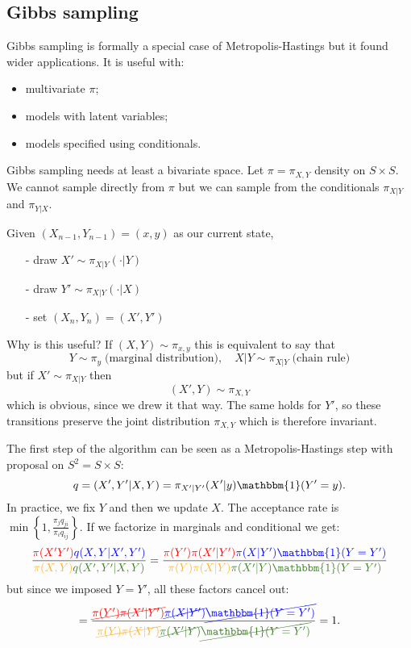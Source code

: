 \documentclass{article}
\begin{document}
	\subsection{Gibbs sampling}
	Gibbs sampling is formally a special case of Metropolis-Hastings but it found wider applications. It is useful with:
	\begin{itemize}
		\item multivariate $\pi$;
		\item models with latent variables;
		\item models specified using conditionals.
	\end{itemize}
	Gibbs sampling needs at least a bivariate space. Let $\pi=\pi_{X,Y}$ density on $S\times S$. We cannot sample directly from $\pi$ but we can sample from the conditionals $\pi_{X|Y}$ and $\pi_{Y|X}$.
	\begin{algorithm}
		Given $(X_{n-1},Y_{n-1})=(x,y)$ as our current state,
		\begin{itemize}
			\item [-] draw $X'\sim\pi_{X|Y}(\cdot|Y)$ 
			\item [-] draw $Y'\sim\pi_{X|Y}(\cdot|X)$
			\item [-] set $(X_n,Y_n)=(X',Y')$
		\end{itemize}
	\end{algorithm}
	Why is this useful? If $(X,Y)\sim\pi_{x,y}$ this is equivalent to say that
	\[
	Y\sim \pi_y \;\text{(marginal distribution)},\quad X|Y\sim\pi_{X|Y}\;\text{(chain rule)}
	\]
	but if $X'\sim \pi_{X|Y}$ then 
	\[
	(X',Y)\sim\pi_{X,Y}
	\]
	which is obvious, since we drew it that way. The same holds for $Y'$, so these transitions preserve the joint distribution $\pi_{X,Y}$ which is therefore invariant.
	\begin{proof2}
		The first step of the algorithm can be seen as a Metropolis-Hastings step with proposal on $S^2=S\times S$:
		\[
		q=(X',Y'|X,Y)=\pi_{X'|Y'}(X'|y)\mathbbm{1}(Y'=y).
		\]
		In practice, we fix $Y$ and then we update $X$. The acceptance rate is $\min\left\{1,\frac{\pi_jq_{ji}}{\pi_iq_{ij}}\right\}$. If we factorize in marginals and conditional we get:
		\[
		\frac{\textcolor{red}{\pi(X'Y')}\textcolor{blue}{q(X,Y|X',Y')}}{\textcolor{Dandelion}{\pi(X,Y)}\textcolor{OliveGreen}{q(X',Y'|X,Y)}}=\frac{\textcolor{red}{\pi(Y')\pi(X'|Y')}\textcolor{blue}{\pi(X|Y')\mathbbm{1}(Y=Y')}}{\textcolor{Dandelion}{\pi(Y)\pi(X|Y)}\textcolor{OliveGreen}{\pi(X'|Y)\mathbbm{1}(Y=Y')}}
		\]
		but since we imposed $Y=Y'$, all these factors cancel out:\[
		=\frac{\textcolor{red}{\cancel{\pi(Y')\pi(X'|Y')}}\textcolor{blue}{\cancel{\pi(X|Y')}\cancel{\mathbbm{1}(Y=Y')}}}{\textcolor{Dandelion}{\cancel{\pi(Y)\pi(X|Y)}}\textcolor{OliveGreen}{\cancel{\pi(X'|Y)}\cancel{\mathbbm{1}(Y=Y')}}}=1.\]
	\end{proof2}
\end{document}
